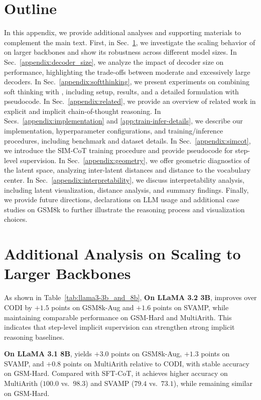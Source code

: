 \section*{Outline}
In this appendix, we provide additional analyses and supporting materials to complement the main text.  
First, in Sec.~\ref{appendix:scaling_backbones}, we investigate the scaling behavior of \methodname on larger backbones and show its robustness across different model sizes.  
In Sec.~\ref{appendix:decoder_size}, we analyze the impact of decoder size on performance, highlighting the trade-offs between moderate and excessively large decoders.  
In Sec.~\ref{appendix:softthinking}, we present experiments on combining soft thinking with \methodname, including setup, results, and a detailed formulation with pseudocode.  
In Sec.~\ref{appendix:related}, we provide an overview of related work in explicit and implicit chain-of-thought reasoning.  
In Secs.~\ref{appendix:implementation} and \ref{app:train-infer-details}, we describe our implementation, hyperparameter configurations, and training/inference procedures, including benchmark and dataset details.  
In Sec.~\ref{appendix:simcot}, we introduce the SIM-CoT training procedure and provide pseudocode for step-level supervision.  
In Sec.~\ref{appendix:geometry}, we offer geometric diagnostics of the latent space, analyzing inter-latent distances and distance to the vocabulary center.  
In Sec.~\ref{appendix:interpretability}, we discuss interpretability analysis, including latent visualization, distance analysis, and summary findings.  
Finally, we provide future directions, declarations on LLM usage and additional case studies on GSM8k to further illustrate the reasoning process and visualization choices.


\section{Additional Analysis on Scaling to Larger Backbones}
\label{appendix:scaling_backbones}

As shown in Table~\ref{tab:llama3-3b_and_8b}, \textbf{On LLaMA 3.2 3B}, \methodname improves over CODI by $+1.5$ points on GSM8k-Aug and $+1.6$ points on SVAMP, while maintaining comparable performance on GSM-Hard and MultiArith.  
This indicates that step-level implicit supervision can strengthen strong implicit reasoning baselines.  

\textbf{On LLaMA 3.1 8B}, \methodname yields $+3.0$ points on GSM8k-Aug, $+1.3$ points on SVAMP, and $+0.8$ points on MultiArith relative to CODI, with stable accuracy on GSM-Hard.  
Compared with SFT-CoT, it achieves higher accuracy on MultiArith ($100.0$ vs.\ $98.3$) and SVAMP ($79.4$ vs.\ $73.1$), while remaining similar on GSM-Hard.  

